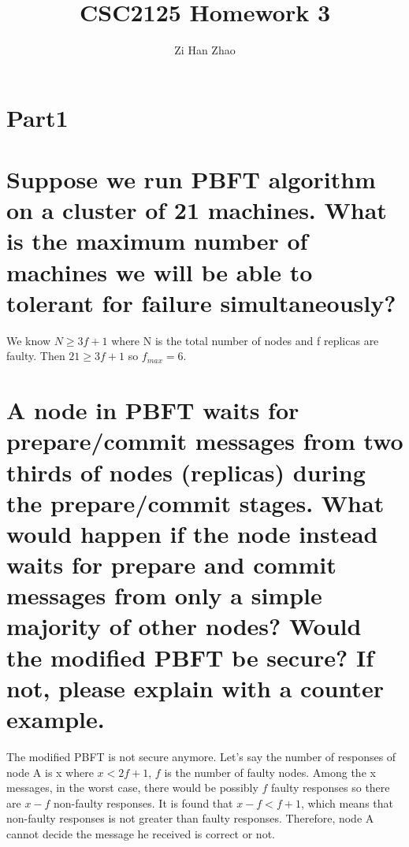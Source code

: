 \documentclass{article}
\author{Zi Han Zhao}
\affil{1001103708}
\date{}
\title{CSC2125 Homework 3}
\begin{document}
\maketitle
\renewcommand{\thesubsection}{(\alph{subsection})}
\section*{Part1}
\section{Suppose we run PBFT algorithm on a cluster of 21 machines. What is the
maximum number of machines we will be able to tolerant for failure
simultaneously?}
We know $N\geqslant3f+1$ where N is the total number of nodes and f replicas are faulty. Then $21\geqslant3f+1$ so $f_{max}=6$.
\section{A node in PBFT waits for prepare/commit messages from two thirds of nodes
(replicas) during the prepare/commit stages. What would happen if the node
instead waits for prepare and commit messages from only a simple majority of
other nodes? Would the modified PBFT be secure? If not, please explain with a
counter example.}
The modified PBFT is not secure anymore.
Let's say the number of responses of node A is x where $x<2f+1$, 
$f$ is the number of faulty nodes. Among the x messages, 
in the worst case, 
there would be possibly $f$ faulty responses so there are $x-f$ non-faulty responses. 
It is found that $x-f<f+1$, 
which means that non-faulty responses is not greater than faulty responses. 
Therefore, node A cannot decide the message he received is correct or not.
\end{document}
